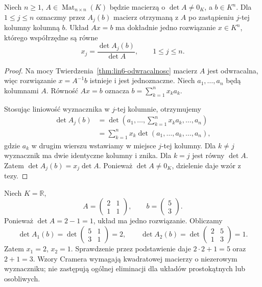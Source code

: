 \begin{twierdzenie}
\label{thm:lin6-cramer}
Niech \(n\geq1\),
\(A\in\operatorname{Mat}_{n\times n}(K)\)
będzie macierzą o \(\det A\ne0_K\),
a \(b\in K^n\).
Dla \(1\leq j\leq n\) oznaczmy
przez \(A_j(b)\) macierz otrzymaną
z \(A\) po zastąpieniu \(j\)-tej
kolumny kolumną \(b\).
Układ \(Ax=b\) ma dokładnie jedno
rozwiązanie \(x\in K^n\), którego
współrzędne są równe
\[
 x_j=\frac{\det A_j(b)}{\det A},
 \qquad 1\leq j\leq n.
\]
\end{twierdzenie}
\begin{proof}
Na mocy
Twierdzenia~\ref{thm:lin6-odwracalnosc}
macierz \(A\) jest odwracalna,
więc rozwiązanie \(x=A^{-1}b\)
istnieje i jest jednoznaczne.
Niech \(a_1,\ldots,a_n\) będą
kolumnami \(A\). Równość \(Ax=b\)
oznacza
\(b=\sum_{k=1}^n x_ka_k\).

Stosując liniowość wyznacznika
w \(j\)-tej kolumnie, otrzymujemy
\[
 \begin{aligned}
 \det A_j(b)
 &=\det(a_1,\ldots,
        \textstyle\sum_{k=1}^n x_ka_k,
        \ldots,a_n)\\
 &=\sum_{k=1}^n x_k
   \det(a_1,\ldots,a_k,\ldots,a_n),
 \end{aligned}
\]
gdzie \(a_k\) w drugim wierszu
wstawiamy w miejsce \(j\)-tej kolumny.
Dla \(k\ne j\) wyznacznik
ma dwie identyczne kolumny i znika.
Dla \(k=j\) jest równy \(\det A\).
Zatem \(\det A_j(b)=x_j\det A\).
Ponieważ \(\det A\ne0_K\),
dzielenie daje wzór z tezy.
\end{proof}

\begin{przyklad}
\label{prz:lin6-cramer-2}
Niech \(K=\mathbb R\),
\[
 A=\begin{pmatrix}2&1\\1&1\end{pmatrix},
 \qquad b=\begin{pmatrix}5\\3\end{pmatrix}.
\]
Ponieważ \(\det A=2-1=1\),
układ ma jedno rozwiązanie.
Obliczamy
\[
 \det A_1(b)
 =\det\begin{pmatrix}5&1\\3&1\end{pmatrix}
 =2,\qquad
 \det A_2(b)
 =\det\begin{pmatrix}2&5\\1&3\end{pmatrix}
 =1.
\]
Zatem \(x_1=2\), \(x_2=1\).
Sprawdzenie przez podstawienie daje
\(2\cdot2+1=5\) oraz \(2+1=3\).
Wzory Cramera wymagają kwadratowej
macierzy o niezerowym wyznaczniku;
nie zastępują ogólnej eliminacji
dla układów prostokątnych lub osobliwych.
\end{przyklad}


